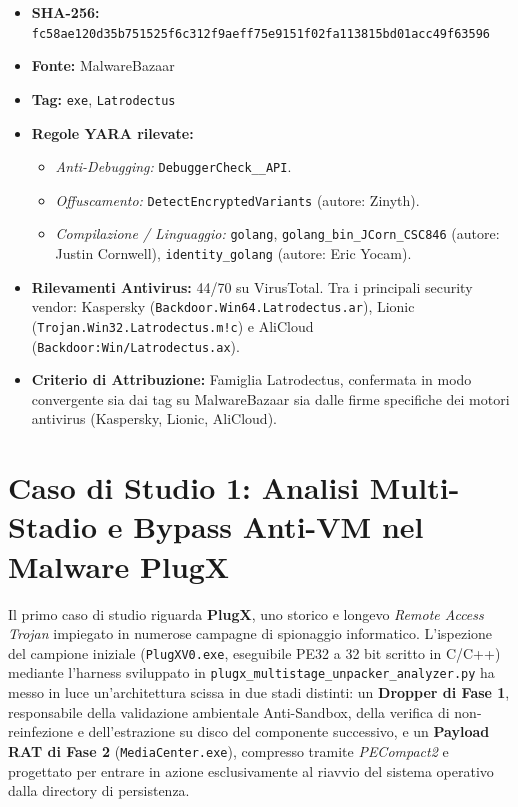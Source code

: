 \documentclass[11pt, a4paper]{article}
\begin{document}
\begin{itemize}
	\item \textbf{SHA-256:} {\small\texttt{fc58ae120d35b751525f6c312f9aeff75e9151f02fa113815bd01acc49f63596}}
	\item \textbf{Fonte:} MalwareBazaar
	\item \textbf{Tag:} \texttt{exe}, \texttt{Latrodectus}
	\item \textbf{Regole YARA rilevate:}
	\begin{itemize}
		\item \textit{Anti-Debugging:} \texttt{Debugger\allowbreak{}Check\_\_\allowbreak{}API}.
		\item \textit{Offuscamento:} \texttt{Detect\allowbreak{}Encrypted\allowbreak{}Variants} (autore: Zinyth).
		\item \textit{Compilazione / Linguaggio:} \texttt{golang}, \texttt{golang\_\allowbreak{}bin\_\allowbreak{}JCorn\_\allowbreak{}CSC846} (autore: Justin Cornwell), \texttt{identity\_\allowbreak{}golang} (autore: Eric Yocam).
	\end{itemize}
	\item \textbf{Rilevamenti Antivirus:} 44/70 su VirusTotal. Tra i principali security vendor: Kaspersky (\texttt{Backdoor.\allowbreak{}Win64.\allowbreak{}Latrodectus.\allowbreak{}ar}), Lionic (\texttt{Trojan.\allowbreak{}Win32.\allowbreak{}Latrodectus.\allowbreak{}m!c}) e AliCloud (\texttt{Backdoor:Win/\allowbreak{}Latrodectus.\allowbreak{}ax}).
	\item \textbf{Criterio di Attribuzione:} Famiglia Latrodectus, confermata in modo convergente sia dai tag su MalwareBazaar sia dalle firme specifiche dei motori antivirus (Kaspersky, Lionic, AliCloud).
\end{itemize}

\section{Caso di Studio 1: Analisi Multi-Stadio e Bypass Anti-VM nel Malware PlugX}

Il primo caso di studio riguarda \textbf{PlugX}, uno storico e longevo \textit{Remote Access Trojan} impiegato in numerose campagne di spionaggio informatico. L'ispezione del campione iniziale (\texttt{PlugXV0.exe}, eseguibile PE32 a 32 bit scritto in C/C++) mediante l'harness sviluppato in \texttt{plugx\_\allowbreak{}multistage\_\allowbreak{}unpacker\_\allowbreak{}analyzer.\allowbreak{}py} ha messo in luce un'architettura scissa in due stadi distinti: un \textbf{Dropper di Fase 1}, responsabile della validazione ambientale Anti-Sandbox, della verifica di non-reinfezione e dell'estrazione su disco del componente successivo, e un \textbf{Payload RAT di Fase 2} (\texttt{Media\allowbreak{}Center.\allowbreak{}exe}), compresso tramite \textit{PECompact2} e progettato per entrare in azione esclusivamente al riavvio del sistema operativo dalla directory di persistenza.
\end{document}
